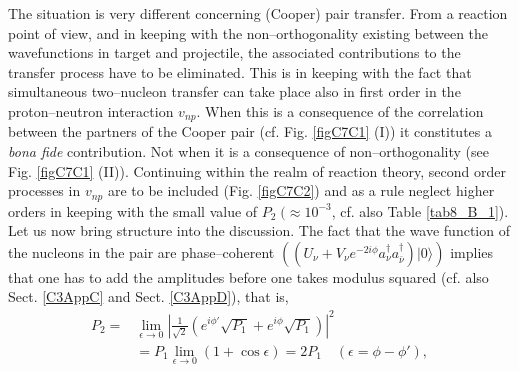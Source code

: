 The situation is very different concerning (Cooper) pair transfer. From a reaction point of view, and in keeping with the non--orthogonality existing between the wavefunctions in target and projectile, the associated contributions to the transfer process have to be eliminated. This is in keeping with the fact that simultaneous two--nucleon transfer can take place also in first order in the proton--neutron interaction     $v_{np}$. When this is a consequence of the correlation between the partners of the Cooper pair (cf. Fig. \ref{figC7C1} (I)) it constitutes a \emph{bona fide} contribution. Not when it is a consequence of non--orthogonality (see Fig. \ref{figC7C1} (II)). Continuing within the realm of reaction theory, second order processes in $v_{np}$ are to be included (Fig. \ref{figC7C2}) and as a rule neglect higher orders in keeping with the small value of $P_2 \;(\approx10^{-3}$, cf. also Table \ref{tab8_B_1}). Let us now bring structure into the discussion. The fact that the wave function of the nucleons in the pair are phase--coherent $(\left(U_\nu+V_\nu e^{-2i\phi}a_\nu^\dagger a_{\bar\nu}^\dagger\right)|0\rangle)$ implies that one has to add the amplitudes before one takes modulus squared (cf. also Sect. \ref{C3AppC} and Sect. \ref{C3AppD}), that is,
\begin{align}\label{eq3.2.19}
\nonumber P_2=&\lim_{\epsilon\rightarrow 0}\left|\frac{1}{\sqrt{2}}\left(e^{i\phi'}\sqrt{P_1}+e^{i\phi}\sqrt{P_1}\right)\right|^2\\
&=P_1 \lim_{\epsilon\rightarrow 0} (1+\cos \epsilon)= 2P_1\quad (\epsilon=\phi-\phi'),
\end{align}
